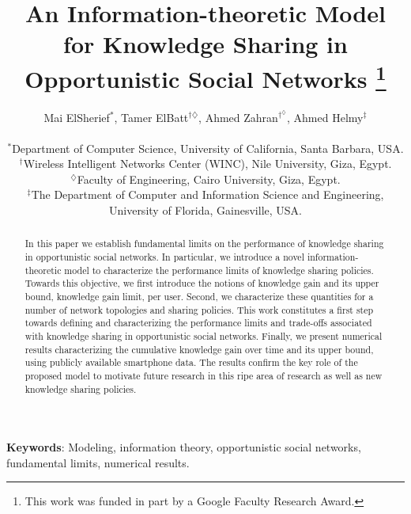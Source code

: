 \documentclass[conference]{IEEEtran}
\date{}
\theoremstyle{definition}
\begin{document}
\title{{\fontsize{20}{20}\selectfont An Information-theoretic Model for Knowledge Sharing in Opportunistic Social Networks} \thanks{This work was funded in part by a Google Faculty Research Award.}}

\author{\large Mai ElSherief$^*$, Tamer ElBatt$^{\dagger\diamondsuit}$, Ahmed Zahran$^{\dagger^\diamondsuit}$, Ahmed Helmy$^{\ddagger}$  \\ [.1in]
\small  \begin{tabular}{c} 
$^*$Department of Computer Science, University of California, Santa Barbara, USA.\\
$^\dagger$Wireless Intelligent Networks Center (WINC), Nile University, Giza, Egypt.\\
$^\diamondsuit$Faculty of Engineering, Cairo University, Giza, Egypt.\\
$^\ddagger$The Department of Computer and Information Science and Engineering,
University of Florida, Gainesville, USA. \\
\end{tabular} }

\maketitle

\begin{abstract}
In this paper we establish fundamental limits on the performance of knowledge sharing in opportunistic social networks. In particular, we introduce a novel information-theoretic model to characterize the performance limits of knowledge sharing policies. Towards this objective, we first introduce the notions of knowledge gain and its upper bound, knowledge gain limit, per user. Second, we characterize these quantities for a number of network topologies and sharing policies. This work constitutes a first step towards defining and characterizing the performance limits and trade-offs associated with knowledge sharing in opportunistic social networks. Finally, we present numerical results characterizing the cumulative knowledge gain over time and its upper bound, using publicly available smartphone data. The results confirm the key role of the proposed 
model to motivate future research in this ripe area of research as well as new knowledge 
sharing policies.
\end{abstract}
\noindent \textbf{Keywords}: Modeling, information theory, opportunistic social networks, fundamental limits, numerical results.
\IEEEpeerreviewmaketitle
\vspace{-0.2 cm}
\end{document}
